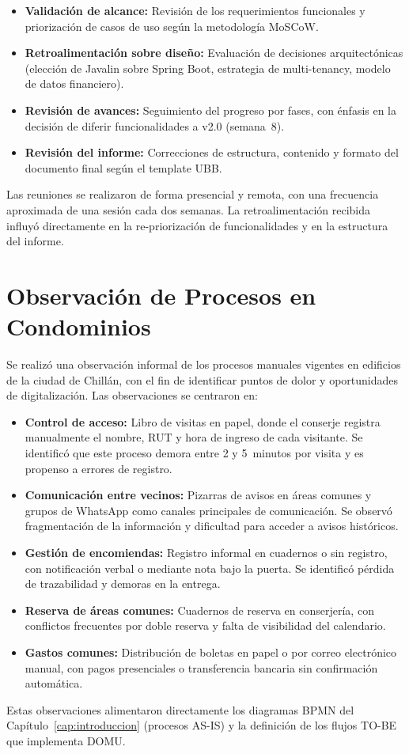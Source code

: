 \begin{itemize}
    \item \textbf{Validación de alcance:} Revisión de los requerimientos funcionales y priorización de casos de uso según la metodología MoSCoW.
    \item \textbf{Retroalimentación sobre diseño:} Evaluación de decisiones arquitectónicas (elección de Javalin sobre Spring Boot, estrategia de multi-tenancy, modelo de datos financiero).
    \item \textbf{Revisión de avances:} Seguimiento del progreso por fases, con énfasis en la decisión de diferir funcionalidades a v2.0 (semana~8).
    \item \textbf{Revisión del informe:} Correcciones de estructura, contenido y formato del documento final según el template UBB.
\end{itemize}

Las reuniones se realizaron de forma presencial y remota, con una frecuencia aproximada de una sesión cada dos semanas. La retroalimentación recibida influyó directamente en la re-priorización de funcionalidades y en la estructura del informe.

\section{Observación de Procesos en Condominios}

Se realizó una observación informal de los procesos manuales vigentes en edificios de la ciudad de Chillán, con el fin de identificar puntos de dolor y oportunidades de digitalización. Las observaciones se centraron en:

\begin{itemize}
    \item \textbf{Control de acceso:} Libro de visitas en papel, donde el conserje registra manualmente el nombre, RUT y hora de ingreso de cada visitante. Se identificó que este proceso demora entre 2 y 5~minutos por visita y es propenso a errores de registro.

    \item \textbf{Comunicación entre vecinos:} Pizarras de avisos en áreas comunes y grupos de WhatsApp como canales principales de comunicación. Se observó fragmentación de la información y dificultad para acceder a avisos históricos.

    \item \textbf{Gestión de encomiendas:} Registro informal en cuadernos o sin registro, con notificación verbal o mediante nota bajo la puerta. Se identificó pérdida de trazabilidad y demoras en la entrega.

    \item \textbf{Reserva de áreas comunes:} Cuadernos de reserva en conserjería, con conflictos frecuentes por doble reserva y falta de visibilidad del calendario.

    \item \textbf{Gastos comunes:} Distribución de boletas en papel o por correo electrónico manual, con pagos presenciales o transferencia bancaria sin confirmación automática.
\end{itemize}

Estas observaciones alimentaron directamente los diagramas BPMN del Capítulo~\ref{cap:introduccion} (procesos AS-IS) y la definición de los flujos TO-BE que implementa DOMU.
